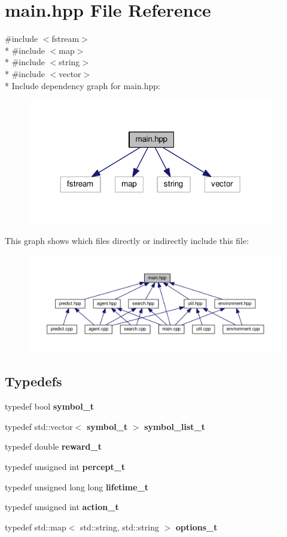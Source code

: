 \section{main.\+hpp File Reference}
\label{main_8hpp}
{\ttfamily \#include $<$fstream$>$}\\*
{\ttfamily \#include $<$map$>$}\\*
{\ttfamily \#include $<$string$>$}\\*
{\ttfamily \#include $<$vector$>$}\\*
Include dependency graph for main.\+hpp\+:
\nopagebreak
\begin{figure}[H]
\begin{center}
\leavevmode
\includegraphics[width=305pt]{main_8hpp__incl}
\end{center}
\end{figure}
This graph shows which files directly or indirectly include this file\+:
\nopagebreak
\begin{figure}[H]
\begin{center}
\leavevmode
\includegraphics[width=350pt]{main_8hpp__dep__incl}
\end{center}
\end{figure}
\subsection*{Typedefs}
\begin{DoxyCompactItemize}
\item 
typedef bool {\bf symbol\+\_\+t}
\item 
typedef std\+::vector$<$ {\bf symbol\+\_\+t} $>$ {\bf symbol\+\_\+list\+\_\+t}
\item 
typedef double {\bf reward\+\_\+t}
\item 
typedef unsigned int {\bf percept\+\_\+t}
\item 
typedef unsigned long long {\bf lifetime\+\_\+t}
\item 
typedef unsigned int {\bf action\+\_\+t}
\item 
typedef std\+::map$<$ std\+::string, std\+::string $>$ {\bf options\+\_\+t}
\end{DoxyCompactItemize}
